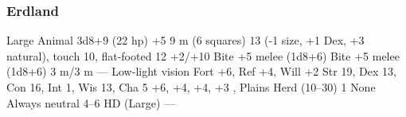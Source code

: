 \subsubsection{Erdland}
\begin{MonsterStats}
{Large Animal}
{3d8+9 (22 hp)}
{+5}
{9 m (6 squares)}
{13 (-1 size, +1 Dex, +3 natural), touch 10, flat-footed 12}
{+2/+10}
{Bite +5 melee (1d8+6)}
{Bite +5 melee (1d8+6)}
{3 m/3 m}
{---}
{Low-light vision}
{Fort +6, Ref +4, Will +2}
{Str 19, Dex 13, Con 16, Int 1, Wis 13, Cha 5}
{ +6,  +4,  +4,  +3}
{, }
{Plains}
{Herd (10--30)}
{1}
{None}
{Always neutral}
{4--6 HD (Large)}
{---}
\end{MonsterStats}

